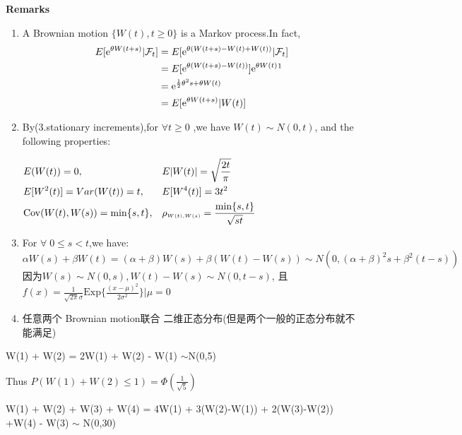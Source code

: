 {\bf Remarks}
\begin{enumerate}
    \item A Brownian motion $\{W(t),t\ge 0\}$ is a Markov process.In fact,
    \begin{align*}
        E[\mathrm{e}^{\theta W(t+s)} | \mathcal{F}_t] &=E[\mathrm{e} ^{\theta(W(t+s) - W(t) + W(t))} | \mathcal{F}_t]\\
        &=E[\mathrm{e} ^{\theta(W(t+s) - W(t) )} ]\mathrm{e}^{\theta W(t)}\footnotemark[1]\\
        &=\mathrm{e} ^{\frac{1}{2}\theta ^2 s + \theta W(t)}\\
        &=E[\mathrm{e}^{\theta W(t+s)}|W(t)]
    \end{align*} 
    \item By(3.stationary increments),for $\forall t \ge 0$ ,we have $W(t)\sim N(0,t) $, and the following properties:
    \begin{framed}
        \hspace*{3em}
        $\begin{aligned}
            &E(W(t)) = 0,&  &E|W(t)| = \sqrt{\frac{2t}{\pi}}\\
            &E[W^2(t)] = Var(W(t)) = t,& &E[W^4(t)] = 3t^2\\
            &{\rm Cov}(W(t),W(s)) = \min \{s,t\},& &\rho_{\scriptscriptstyle W(t),W(s)} = \frac{\min\{s,t\}}{\sqrt{st}}
        \end{aligned}$
    \end{framed}
    \item For $\forall\; 0\le s < t$,we have:
    \[\alpha W(s) + \beta W(t) = (\alpha + \beta)W(s) + \beta (W(t) - W(s)) \sim N(0,(\alpha+\beta)^2s+\beta^2 (t-s)) \]
    因为$W(s) \sim N(0,s),W(t)-W(s) \sim N(0,t-s)$,
    且 $f(x)=\frac{1}{\sqrt{2\pi}\sigma}\mathrm{Exp}\{\frac{\left(x-\mu\right)^2}{2\sigma^2}\}\bigg|\mu=0$
    \item 任意两个 Brownian motion联合 \lrr 二维正态分布(但是两个一般的正态分布就不能满足)
\end{enumerate}



\par
W(1) + W(2) = 2W(1) + W(2) - W(1)  $\sim $N(0,5)\par
Thus $P(W(1) + W(2) \le 1) =\varPhi (\frac{1}{\sqrt{5}}) $ 

\par
W(1) + W(2) + W(3) + W(4) = 4W(1) + 3(W(2)-W(1)) + 2(W(3)-W(2)) +W(4) - W(3) $\sim$ N(0,30)


